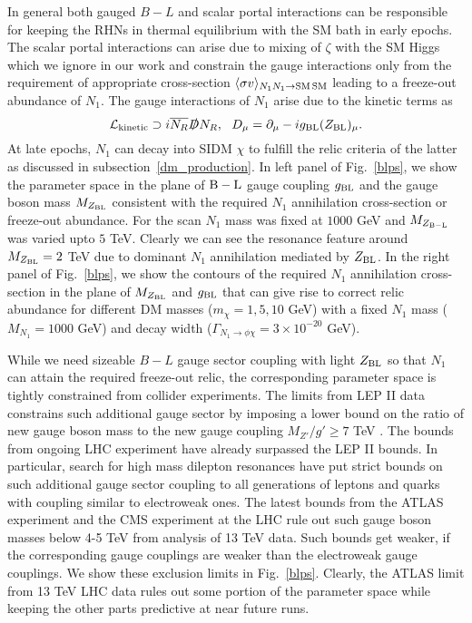 \documentclass[prd,nofootinbib,preprint,superscriptaddress]{revtex4}
\begin{document}
In general both gauged $B-L$ and scalar portal interactions can be responsible for keeping the RHNs in thermal equilibrium with the SM bath in early epochs. The scalar portal interactions can arise due to mixing of $\zeta$ with the SM Higgs which we ignore in our work and constrain the gauge interactions only from the requirement of appropriate cross-section $\langle \sigma v \rangle_{N_1 N_1 \rightarrow {\rm SM\, SM}}$ leading to a freeze-out abundance of $N_1$. The gauge interactions of $N_1$ arise due to the kinetic terms as
\begin{equation}
\mathcal{L}_{\rm kinetic} \supset i\overline{{N}_{R}}
\slashed{D}{N}_{R}, \,\,\,\, D_{\mu} = \partial_{\mu}-ig_{\rm BL} (Z_{\rm BL})_{\mu}.
\end{equation}
At late epochs, $N_1$ can decay into SIDM $\chi$ to fulfill the relic criteria of the latter as discussed in subsection~\ref{dm_production}.
In left panel of Fig.~\ref{blps}, we show the parameter space in the plane of $\rm B-L$ gauge coupling $g_{\rm BL}$ and the gauge boson mass $M_{Z_{\rm BL}}$ consistent with the required $N_1$ annihilation cross-section or freeze-out abundance. For the scan $N_1$ mass was fixed at $1000$ GeV and $M_{Z_{\rm B-L}}$ was varied upto $5$ TeV. Clearly we can see the resonance feature around $M_{Z_{\rm BL}}=2$ TeV due to dominant $N_1$ annihilation mediated by $Z_{\rm BL}$. In the right panel of Fig.~\ref{blps}, we show the contours of the required $N_1$ annihilation cross-section in the plane of $M_{Z_{\rm BL}}$ and $g_{\rm BL}$ that can give rise to correct relic abundance for different DM masses ($m_{\chi} = 1,5,10$ GeV) with a fixed $N_1$ mass ($M_{N_1}=1000$ GeV) and decay width ($\Gamma_{N_{1} \to \phi \chi}=3\times10^{-20}$ GeV). 



While we need sizeable $B-L$ gauge sector coupling with light $Z_{\rm BL}$ so that $N_1$ can attain the required freeze-out relic, the corresponding parameter space is tightly constrained from collider experiments. The limits from LEP II data constrains such additional gauge sector by imposing a lower bound on the ratio of new gauge boson mass to the new gauge coupling $M_{Z'}/g' \geq 7$ TeV \cite{Carena:2004xs, Cacciapaglia:2006pk}. The bounds from ongoing LHC experiment have already surpassed the LEP II bounds. In particular, search for high mass dilepton resonances have put strict bounds on such additional gauge sector coupling to all generations of leptons and quarks with coupling similar to electroweak ones. The latest bounds from the ATLAS experiment \cite{Aaboud:2017buh, Aad:2019fac} and the CMS experiment \cite{Sirunyan:2018exx} at the LHC rule out such gauge boson masses below 4-5 TeV from analysis of 13 TeV data. Such bounds get weaker, if the corresponding gauge couplings are weaker \cite{Aaboud:2017buh} than the electroweak gauge couplings. We show these exclusion limits in Fig.~\ref{blps}. Clearly, the ATLAS limit from 13 TeV LHC data rules out some portion of the parameter space while keeping the other parts predictive at near future runs.
\end{document}
